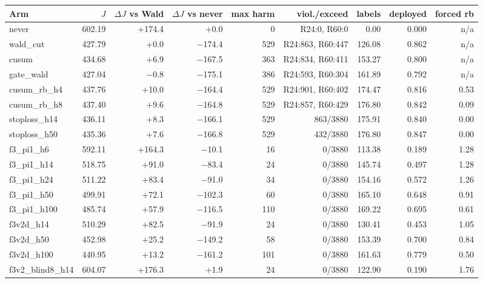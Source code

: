 \begin{tabular}{@{}l r r r r r r r r@{}}
\toprule
Arm & $J$ & $\Delta J$ vs Wald & $\Delta J$ vs never & max harm & viol./exceed & labels & deployed & forced rb \\
\midrule
never & 602.19 & +174.4 & +0.0 & 0 & R24:0, R60:0 & 0.00 & 0.000 & n/a \\
wald\_cut & 427.79 & +0.0 & $-$174.4 & 529 & R24:863, R60:447 & 126.08 & 0.862 & n/a \\
cusum & 434.68 & +6.9 & $-$167.5 & 363 & R24:834, R60:411 & 153.27 & 0.800 & n/a \\
gate\_wald & 427.04 & $-$0.8 & $-$175.1 & 386 & R24:593, R60:304 & 161.89 & 0.792 & n/a \\
cusum\_rb\_h4 & 437.76 & +10.0 & $-$164.4 & 529 & R24:901, R60:402 & 174.47 & 0.816 & 0.53 \\
cusum\_rb\_h8 & 437.40 & +9.6 & $-$164.8 & 529 & R24:857, R60:429 & 176.80 & 0.842 & 0.09 \\
stoploss\_h14 & 436.11 & +8.3 & $-$166.1 & 529 & 863/3880 & 175.91 & 0.840 & 0.00 \\
stoploss\_h50 & 435.36 & +7.6 & $-$166.8 & 529 & 432/3880 & 176.80 & 0.847 & 0.00 \\
f3\_pi1\_h6 & 592.11 & +164.3 & $-$10.1 & 16 & 0/3880 & 113.38 & 0.189 & 1.28 \\
f3\_pi1\_h14 & 518.75 & +91.0 & $-$83.4 & 24 & 0/3880 & 145.74 & 0.497 & 1.28 \\
f3\_pi1\_h24 & 511.22 & +83.4 & $-$91.0 & 34 & 0/3880 & 154.16 & 0.572 & 1.26 \\
f3\_pi1\_h50 & 499.91 & +72.1 & $-$102.3 & 60 & 0/3880 & 165.10 & 0.648 & 0.91 \\
f3\_pi1\_h100 & 485.74 & +57.9 & $-$116.5 & 110 & 0/3880 & 169.22 & 0.695 & 0.61 \\
f3v2d\_h14 & 510.29 & +82.5 & $-$91.9 & 24 & 0/3880 & 130.41 & 0.453 & 1.05 \\
f3v2d\_h50 & 452.98 & +25.2 & $-$149.2 & 58 & 0/3880 & 153.39 & 0.700 & 0.84 \\
f3v2d\_h100 & 440.95 & +13.2 & $-$161.2 & 101 & 0/3880 & 161.63 & 0.779 & 0.50 \\
f3v2\_blind8\_h14 & 604.07 & +176.3 & +1.9 & 24 & 0/3880 & 122.90 & 0.190 & 1.76 \\
\bottomrule
\end{tabular}
